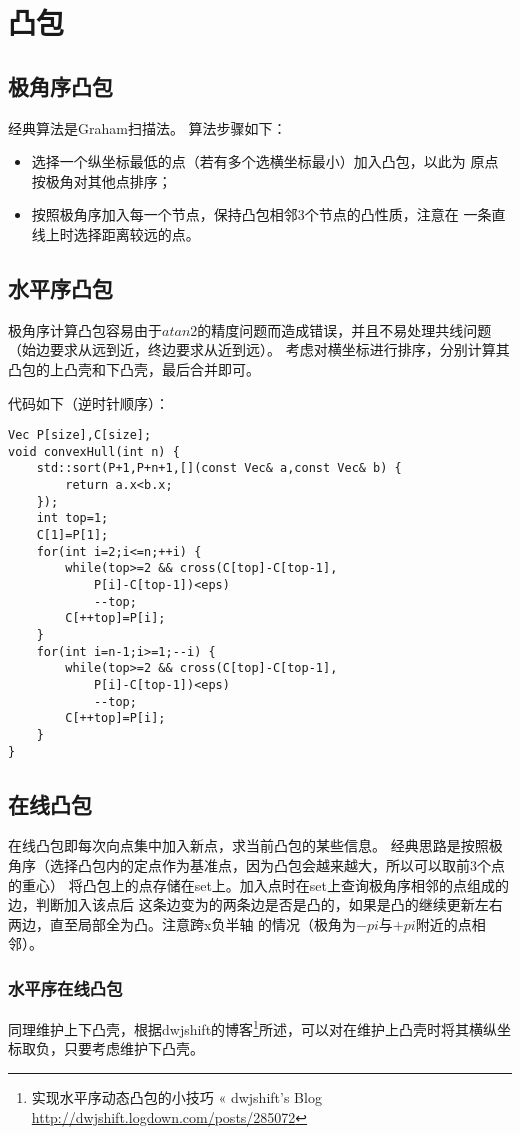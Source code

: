\section{凸包}
\subsection{极角序凸包}
经典算法是Graham扫描法。
算法步骤如下：
\begin{itemize}
	\item 选择一个纵坐标最低的点（若有多个选横坐标最小）加入凸包，以此为
	      原点按极角对其他点排序；
	\item 按照极角序加入每一个节点，保持凸包相邻3个节点的凸性质，注意在
	      一条直线上时选择距离较远的点。
\end{itemize}
\subsection{水平序凸包}
极角序计算凸包容易由于$atan2$的精度问题而造成错误，并且不易处理共线问题
（始边要求从远到近，终边要求从近到远）。
考虑对横坐标进行排序，分别计算其凸包的上凸壳和下凸壳，最后合并即可。

代码如下（逆时针顺序）：
\begin{lstlisting}
Vec P[size],C[size];
void convexHull(int n) {
    std::sort(P+1,P+n+1,[](const Vec& a,const Vec& b) {
        return a.x<b.x;
    });
    int top=1;
    C[1]=P[1];
    for(int i=2;i<=n;++i) {
        while(top>=2 && cross(C[top]-C[top-1],
            P[i]-C[top-1])<eps)
            --top;
        C[++top]=P[i];
    }
    for(int i=n-1;i>=1;--i) {
        while(top>=2 && cross(C[top]-C[top-1],
            P[i]-C[top-1])<eps)
            --top;
        C[++top]=P[i];
    }
}
\end{lstlisting}
\subsection{在线凸包}
在线凸包即每次向点集中加入新点，求当前凸包的某些信息。
经典思路是按照极角序（选择凸包内的定点作为基准点，因为凸包会越来越大，所以可以取前3个点的重心）
将凸包上的点存储在set上。加入点时在set上查询极角序相邻的点组成的边，判断加入该点后
这条边变为的两条边是否是凸的，如果是凸的继续更新左右两边，直至局部全为凸。注意跨x负半轴
的情况（极角为$-pi$与$+pi$附近的点相邻）。
\subsubsection{水平序在线凸包}
同理维护上下凸壳，根据dwjshift的博客\footnote{
	实现水平序动态凸包的小技巧 « dwjshift's Blog
	\url{http://dwjshift.logdown.com/posts/285072}
}所述，可以对在维护上凸壳时将其横纵坐标取负，只要考虑维护下凸壳。

